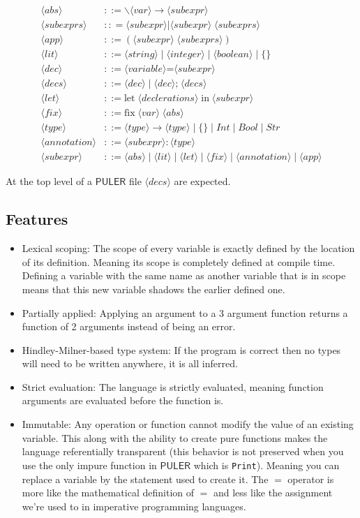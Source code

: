 \documentclass{article} %
\newcommand{\PULER}{\mathsf{PULER}}
\newcommand{\key}[1]{\langle #1 \rangle}
\begin{document}
\begin{align*}
     \key{abs} & ::= \backslash \key{var} \to \key{subexpr} \\
     \key{subexprs} & :: = \key{subexpr} | \key{subexpr} \; \key{subexprs}\\
     \key{app} & ::= (\key{subexpr} \; \key{subexprs})\\
     \key{lit} & ::= \key{string} \; | \; \key{integer} \; | \; \key{boolean} \; | \; \{\} \\
     \key{dec} & ::= \key{variable} \text{=} \key{subexpr} \\
     \key{decs} & ::= \key{dec} \; | \; \key{dec}\text{;} \; \key{decs} \\
     \key{let} & ::= \text{let}\; \key{declerations} \; \text{in} \; \key{subexpr} \\
     \key{fix} & ::= \text{fix} \; \key{var} \; \key{abs} \\
     \key{type} & ::= \key{type} \to \key{type} \; | \; \{\} \; | \; Int \; | \; Bool \; | \; Str \\
     \key{annotation} & ::= \key{subexpr} : \key{type} \\
     \key{subexpr} & ::= \key{abs} \; | \; \key{lit} \; | \; \key{let} \; | \; \key{fix} \; | \; \key{annotation} \; | \; \key{app}
\end{align*}

At the top level of a $\PULER$ file $\key{decs}$ are expected.

\subsection{Features}\label{features}
    \begin{itemize}
        \item Lexical scoping: The scope of every variable is exactly defined by the location of its definition. Meaning its scope is completely defined at compile time. Defining a variable with the same name as another variable that is in scope means that this new variable shadows the earlier defined one.
        \item Partially applied: Applying an argument to a 3 argument function returns a function of 2 arguments instead of being an error.
        \item Hindley-Milner-based type system: If the program is correct then no types will need to be written anywhere, it is all inferred.
        \item Strict evaluation: The language is strictly evaluated, meaning function arguments are evaluated before the function is.
        \item Immutable: Any operation or function cannot modify the value of an existing variable. This along with the ability to create pure functions makes the language referentially transparent (this behavior is not preserved when you use the only impure function in $\PULER$ which is \texttt{Print}). Meaning you can replace a variable by the statement used to create it. The $=$ operator is more like the mathematical definition of $=$ and less like the assignment we're used to in imperative programming languages.
    \end{itemize}
\end{document}
